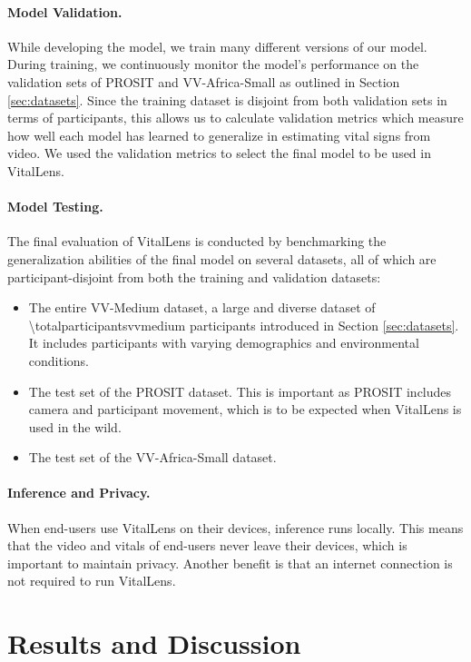 \documentclass{article}
\begin{document}
\paragraph{Model Validation.}
While developing the model, we train many different versions of our model.
During training, we continuously monitor the model's performance on the validation sets of PROSIT and VV-Africa-Small as outlined in Section \ref{sec:datasets}.
Since the training dataset is disjoint from both validation sets in terms of participants, this allows us to calculate validation metrics which measure how well each model has learned to generalize in estimating vital signs from video.
We used the validation metrics to select the final model to be used in VitalLens.

\paragraph{Model Testing.}
The final evaluation of VitalLens is conducted by benchmarking the generalization abilities of the final model on several datasets, all of which are participant-disjoint from both the training and validation datasets:

\begin{itemize}
	\item The entire VV-Medium dataset, a large and diverse dataset of \num{\totalparticipantsvvmedium} participants introduced in Section \ref{sec:datasets}. It includes participants with varying demographics and environmental conditions.
	\item The test set of the PROSIT dataset. This is important as PROSIT includes camera and participant movement, which is to be expected when VitalLens is used in the wild.
	\item The test set of the VV-Africa-Small dataset.
\end{itemize}

\paragraph{Inference and Privacy.}
When end-users use VitalLens on their devices, inference runs locally.
This means that the video and vitals of end-users never leave their devices, which is important to maintain privacy.
Another benefit is that an internet connection is not required to run VitalLens.

\section{Results and Discussion}
\label{sec:results}
\end{document}
